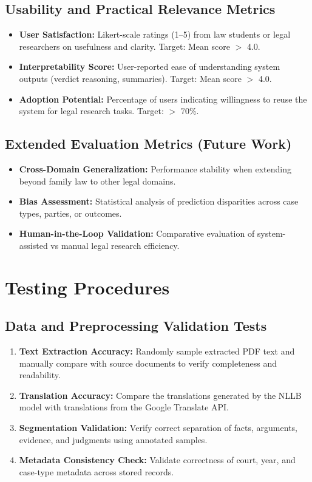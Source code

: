 \subsection{Usability and Practical Relevance Metrics}
\begin{itemize}
	\item \textbf{User Satisfaction:} Likert-scale ratings (1--5) from law students or legal researchers on usefulness and clarity. Target: Mean score $>$ 4.0.
	\item \textbf{Interpretability Score:} User-reported ease of understanding system outputs (verdict reasoning, summaries). Target: Mean score $>$ 4.0.
	\item \textbf{Adoption Potential:} Percentage of users indicating willingness to reuse the system for legal research tasks. Target: $>$ 70\%.
\end{itemize}

\subsection{Extended Evaluation Metrics (Future Work)}
\begin{itemize}
	\item \textbf{Cross-Domain Generalization:} Performance stability when extending beyond family law to other legal domains.
	\item \textbf{Bias Assessment:} Statistical analysis of prediction disparities across case types, parties, or outcomes.
	\item \textbf{Human-in-the-Loop Validation:} Comparative evaluation of system-assisted vs manual legal research efficiency.
\end{itemize}



\newpage
\section{Testing Procedures}
\subsection{Data and Preprocessing Validation Tests}
\begin{enumerate}
	\item \textbf{Text Extraction Accuracy:} Randomly sample extracted PDF text and manually compare with source documents to verify completeness and readability.
	\item \textbf{Translation Accuracy:} Compare the translations generated by the NLLB model with translations from the Google Translate API.
	\item \textbf{Segmentation Validation:} Verify correct separation of facts, arguments, evidence, and judgments using annotated samples.
	\item \textbf{Metadata Consistency Check:} Validate correctness of court, year, and case-type metadata across stored records.
\end{enumerate}

